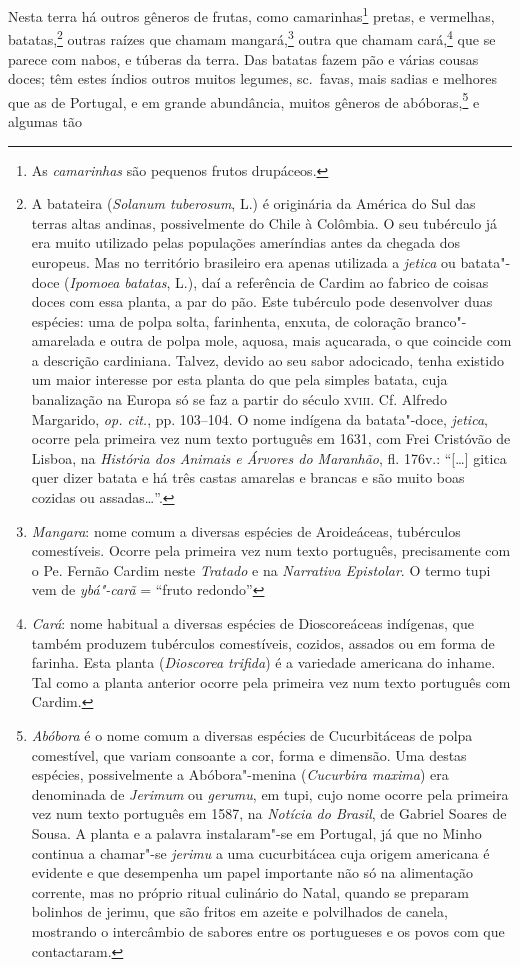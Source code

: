 Nesta terra há outros gêneros de frutas, como camarinhas\footnote{ As
\textit{camarinhas} são pequenos frutos drupáceos.} pretas, e
vermelhas, batatas,\footnote{ A batateira (\textit{Solanum tuberosum}, L.) 
é originária da América do Sul das terras altas andinas,
possivelmente do Chile à Colômbia. O seu tubérculo já era muito
utilizado pelas populações ameríndias antes da chegada dos europeus.
Mas no território brasileiro era apenas utilizada a \textit{jetica}
ou batata"-doce (\textit{Ipomoea batatas}, L.), daí a referência de
Cardim ao fabrico de coisas doces com essa planta, a par do pão. Este
tubérculo pode desenvolver duas espécies: uma de polpa solta,
farinhenta, enxuta, de coloração branco"-amarelada e outra de polpa
mole, aquosa, mais açucarada, o que coincide com a descrição
cardiniana. Talvez, devido ao seu sabor adocicado, tenha existido um
maior interesse por esta planta do que pela simples batata, cuja
banalização na Europa só se faz a partir do século \textsc{xviii}. Cf. Alfredo
Margarido, \textit{op. cit.}, pp. 103--104. O nome indígena da
batata"-doce, \textit{jetica}, ocorre pela primeira vez num texto
português em 1631, com Frei Cristóvão de Lisboa, na \textit{História
dos Animais e Árvores do Maranhão}, fl. 176v.: ``[\ldots] gitica quer dizer
batata e há três castas amarelas e brancas e são muito boas cozidas ou
assadas\ldots''.} outras raízes que chamam mangará,\footnote{ \textit{Mangara}: 
nome comum a diversas espécies de Aroideáceas,
tubérculos comestíveis. Ocorre pela primeira vez num texto português,
precisamente com o Pe. Fernão Cardim neste \textit{Tratado} e na
\textit{Narrativa Epistolar}. O termo tupi vem de \textit{ybá"-carã} = 
``fruto redondo''} outra que chamam cará,\footnote{ \textit{Cará}: nome
habitual a diversas espécies de Dioscoreáceas indígenas, que também
produzem tubérculos comestíveis, cozidos, assados ou em forma de
farinha. Esta planta (\textit{Dioscorea trifida}) é a variedade
americana do inhame. Tal como a planta anterior ocorre pela primeira
vez num texto português com Cardim.} que se parece com nabos, e túberas
da terra. Das batatas fazem pão e várias cousas doces; têm estes índios
outros muitos legumes, sc.~favas, mais sadias e melhores que as de
Portugal, e em grande abundância, muitos gêneros de 
abóboras,\footnote{ \textit{Abóbora} é o nome comum a diversas espécies de
Cucurbitáceas de polpa comestível, que variam consoante a cor, forma e
dimensão. Uma destas espécies, possivelmente a Abóbora"-menina
(\textit{Cucurbira maxima}) era denominada de \textit{Jerimum}
ou \textit{gerumu}, em tupi, cujo nome ocorre pela primeira vez num
texto português em 1587, na \textit{Notícia do Brasil}, de Gabriel
Soares de Sousa. A planta e a palavra instalaram"-se em Portugal, já que
no Minho continua a chamar"-se \textit{jerimu} a uma cucurbitácea cuja
origem americana é evidente e que desempenha um papel importante não só
na alimentação corrente, mas no próprio ritual culinário do Natal,
quando se preparam bolinhos de jerimu, que são fritos em azeite e
polvilhados de canela, mostrando o intercâmbio de sabores entre os
portugueses e os povos com que contactaram.} e algumas tão
